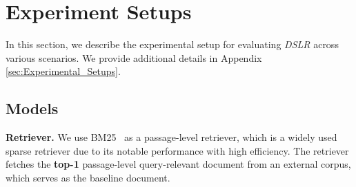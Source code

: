 \section{Experiment Setups}

In this section, we describe the experimental setup for evaluating \textit{DSLR} across various scenarios. We provide additional details in Appendix \ref{sec:Experimental_Setups}.




\subsection{Models}

\noindent\textbf{Retriever.} We use BM25~\cite{bm25} as a passage-level retriever, which is a widely used sparse retriever due to its notable performance with high efficiency. The retriever fetches the \textbf{top-1} passage-level query-relevant document from an external corpus, which serves as the baseline document.


